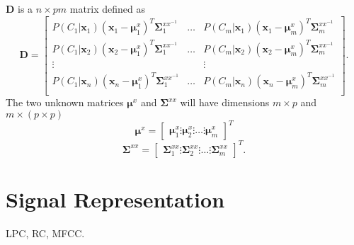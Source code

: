 $\mathbf{D}$ is a $n \times pm$ matrix defined as
\begin{equation}
	\label{eq:D_matrix}
	\mathbf{D} = \begin{bmatrix}
		P(C_1\vert \mathbf{x}_1)(\mathbf{x}_1 - \boldsymbol{\mu}_1^x)^T\mathbf{\Sigma}_1^{xx^{-1}} & \dots & P(C_m\vert \mathbf{x}_1)(\mathbf{x}_1 - \boldsymbol{\mu}_m^x)^T\mathbf{\Sigma}_m^{xx^{-1}} \\
		P(C_1\vert \mathbf{x}_2)(\mathbf{x}_2 - \boldsymbol{\mu}_1^x)^T\mathbf{\Sigma}_1^{xx^{-1}} & \dots & P(C_m\vert \mathbf{x}_2)(\mathbf{x}_2 - \boldsymbol{\mu}_m^x)^T\mathbf{\Sigma}_m^{xx^{-1}} \\
		\vdots & & \vdots \\
		P(C_1\vert \mathbf{x}_n)(\mathbf{x}_n - \boldsymbol{\mu}_1^x)^T\mathbf{\Sigma}_1^{xx^{-1}} & \dots & P(C_m\vert \mathbf{x}_n)(\mathbf{x}_n - \boldsymbol{\mu}_m^x)^T\mathbf{\Sigma}_m^{xx^{-1}} \\
	\end{bmatrix}.
\end{equation}
The two unknown matrices $\boldsymbol{\mu}^x$ and $\mathbf{\Sigma}^{xx}$ will have dimensions $m\times p$ and $m \times (p\times p)$ 
\begin{equation}
	\label{eq:v_matrix}
	\boldsymbol{\mu}^x = 
	\begin{bmatrix}
		\boldsymbol{\mu}^x_1 \vdots \boldsymbol{\mu}^x_2 \vdots \dots \vdots \boldsymbol{\mu}^x_m
	\end{bmatrix}^T
\end{equation}
\begin{equation}
	\label{gamma_matrix}
	\mathbf{\Sigma}^{xx} = 
	\begin{bmatrix}
		\mathbf{\Sigma}_1^{xx} \vdots \mathbf{\Sigma}_2^{xx} \vdots \dots \vdots \mathbf{\Sigma}_m^{xx}
	\end{bmatrix}^T.
\end{equation}

\section{Signal Representation} %
\label{sec:signal_representation}
LPC, RC, MFCC.
